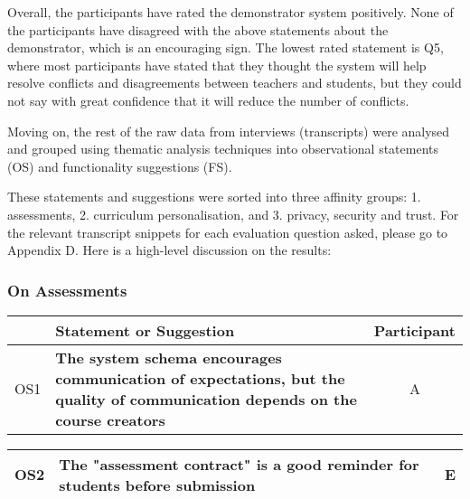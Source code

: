 Overall, the participants have rated the demonstrator system positively.
None of the participants have disagreed with the above statements about the demonstrator,
which is an encouraging sign.
The lowest rated statement is Q5, where most participants have stated that 
they thought the system will help resolve conflicts and disagreements between 
teachers and students, but they could not say with great confidence 
that it will reduce the number of conflicts.

Moving on, the rest of the raw data from interviews (transcripts) were analysed and
grouped using thematic analysis techniques into
observational statements (OS) and functionality suggestions (FS).

These statements and suggestions were sorted into three affinity groups:
1. assessments, 2. curriculum personalisation, and 3. privacy, security and trust.
For the relevant transcript snippets for each evaluation question asked,
please go to Appendix D.
Here is a high-level discussion on the results:

\subsubsection{On Assessments}

\begin{table}[!ht]
	\begin{tabularx}{\textwidth}{|c|X|c|}
		\hline
		    & Statement or Suggestion                                                                                                              & Participant \\
		\hline
		OS1 & \textbf{The system schema encourages communication of expectations, but the quality of communication depends on the course creators} & A           \\
		\hline
	\end{tabularx}
\end{table}

\begin{table}[!ht]
	\begin{tabularx}{\textwidth}{|c|X|c|}
		\hline
		OS2 & \textbf{The "assessment contract" is a good reminder for students before submission} & E \\
		\hline
	\end{tabularx}
\end{table}

